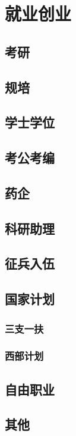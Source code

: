 \chapter[就业创业]{就业创业}

\section[考研]{考研}
\section[规培]{规培}
\section[学士学位]{学士学位}
\section[考公考编]{考公考编}
\section[药企]{药企}
\section[科研助理]{科研助理}
\section[征兵入伍]{征兵入伍}
\section[国家计划]{国家计划}
\subsection[三支一扶]{三支一扶}
\subsection[西部计划]{西部计划}
\section[自由职业]{自由职业}
\section[其他]{其他}